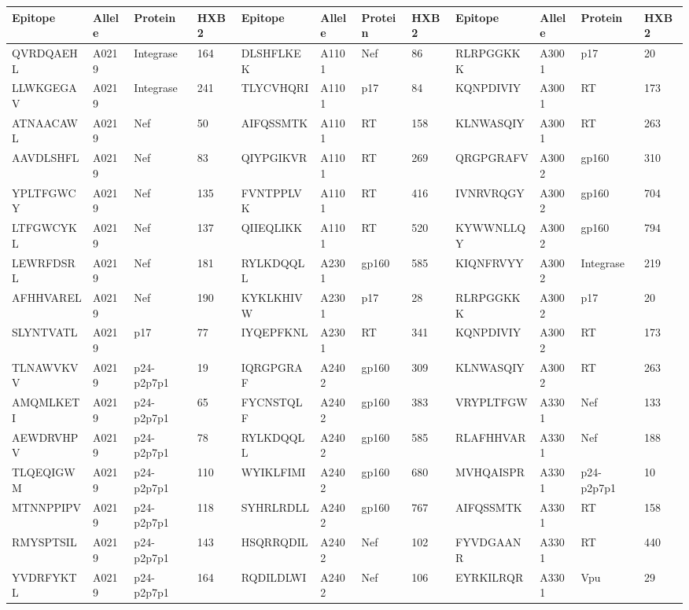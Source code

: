 \begin{table}[htp]
\begin{center}
\begin{sideways}
{
\tiny
\begin{tabulary}{1.5\textwidth}{|l|l|l|l|l|l|l|l|l|l|l|l|}
\hline
Epitope & Allele & Protein & HXB2 & Epitope & Allele & Protein & HXB2 & Epitope & Allele & Protein & HXB2 \bigstrut \\
\hline
QVRDQAEHL & A0219 & Integrase & 164 & DLSHFLKEK & A1101 & Nef & 86 & RLRPGGKKK & A3001 & p17 & 20 \bigstrut[t] \\
LLWKGEGAV & A0219 & Integrase & 241 & TLYCVHQRI & A1101 & p17 & 84 & KQNPDIVIY & A3001 & RT & 173 \\
ATNAACAWL & A0219 & Nef & 50 & AIFQSSMTK & A1101 & RT & 158 & KLNWASQIY & A3001 & RT & 263 \\
AAVDLSHFL & A0219 & Nef & 83 & QIYPGIKVR & A1101 & RT & 269 & QRGPGRAFV & A3002 & gp160 & 310 \\
YPLTFGWCY & A0219 & Nef & 135 & FVNTPPLVK & A1101 & RT & 416 & IVNRVRQGY & A3002 & gp160 & 704 \\
LTFGWCYKL & A0219 & Nef & 137 & QIIEQLIKK & A1101 & RT & 520 & KYWWNLLQY & A3002 & gp160 & 794 \\
LEWRFDSRL & A0219 & Nef & 181 & RYLKDQQLL & A2301 & gp160 & 585 & KIQNFRVYY & A3002 & Integrase & 219 \\
AFHHVAREL & A0219 & Nef & 190 & KYKLKHIVW & A2301 & p17 & 28 & RLRPGGKKK & A3002 & p17 & 20 \\
SLYNTVATL & A0219 & p17 & 77 & IYQEPFKNL & A2301 & RT & 341 & KQNPDIVIY & A3002 & RT & 173 \\
TLNAWVKVV & A0219 & p24-p2p7p1 & 19 & IQRGPGRAF & A2402 & gp160 & 309 & KLNWASQIY & A3002 & RT & 263 \\
AMQMLKETI & A0219 & p24-p2p7p1 & 65 & FYCNSTQLF & A2402 & gp160 & 383 & VRYPLTFGW & A3301 & Nef & 133 \\
AEWDRVHPV & A0219 & p24-p2p7p1 & 78 & RYLKDQQLL & A2402 & gp160 & 585 & RLAFHHVAR & A3301 & Nef & 188 \\
TLQEQIGWM & A0219 & p24-p2p7p1 & 110 & WYIKLFIMI & A2402 & gp160 & 680 & MVHQAISPR & A3301 & p24-p2p7p1 & 10 \\
MTNNPPIPV & A0219 & p24-p2p7p1 & 118 & SYHRLRDLL & A2402 & gp160 & 767 & AIFQSSMTK & A3301 & RT & 158 \\
RMYSPTSIL & A0219 & p24-p2p7p1 & 143 & HSQRRQDIL & A2402 & Nef & 102 & FYVDGAANR & A3301 & RT & 440 \\
YVDRFYKTL & A0219 & p24-p2p7p1 & 164 & RQDILDLWI & A2402 & Nef & 106 & EYRKILRQR & A3301 & Vpu & 29 \\

\end{tabulary}}
\end{sideways}
\end{center}
\end{table}

